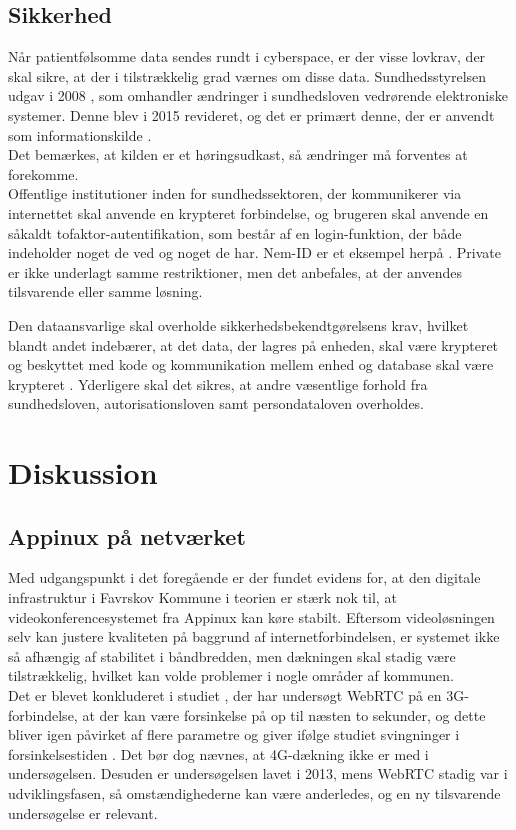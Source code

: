 \subsection{Sikkerhed}
Når patientfølsomme data sendes rundt i cyberspace, er der visse lovkrav, der skal sikre, at der i tilstrækkelig grad værnes om disse data.
Sundhedsstyrelsen udgav i 2008 , som omhandler ændringer i sundhedsloven vedrørende elektroniske systemer. Denne blev i 2015 revideret, og det er primært denne, der er anvendt som informationskilde \cite{vogi}.\\
Det bemærkes, at kilden er et høringsudkast, så ændringer må forventes at forekomme.\\
Offentlige institutioner inden for sundhedssektoren, der kommunikerer via internettet skal anvende en krypteret forbindelse, og brugeren skal anvende en såkaldt tofaktor-autentifikation, som består af en login-funktion, der både indeholder noget de ved og noget de har. Nem-ID er et eksempel herpå \cite{vogi}. Private er ikke underlagt samme restriktioner, men det anbefales, at der anvendes tilsvarende eller samme løsning.

Den dataansvarlige skal overholde sikkerhedsbekendtgørelsens krav, hvilket blandt andet indebærer, at det data, der lagres på enheden, skal være krypteret og beskyttet med kode og kommunikation mellem enhed og database skal være krypteret \cite{shbekendt}. Yderligere skal det sikres, at andre væsentlige forhold fra sundhedsloven, autorisationsloven samt persondataloven overholdes. 

\section{Diskussion}
\subsection{Appinux på netværket}
Med udgangspunkt i det foregående er der fundet evidens for, at den digitale infrastruktur i Favrskov Kommune i teorien er stærk nok til, at videokonferencesystemet fra Appinux kan køre stabilt. Eftersom videoløsningen selv kan justere kvaliteten på baggrund af internetforbindelsen, er systemet ikke så afhængig af stabilitet i båndbredden, men dækningen skal stadig være tilstrækkelig, hvilket kan volde problemer i nogle områder af kommunen.\\
Det er blevet konkluderet i studiet , der har undersøgt WebRTC på en 3G-forbindelse, at der kan være forsinkelse på op til næsten to sekunder, og dette bliver igen påvirket af flere parametre og giver ifølge studiet svingninger i forsinkelsestiden \cite{webrtcjournal}. Det bør dog nævnes, at 4G-dækning ikke er med i undersøgelsen. Desuden er undersøgelsen lavet i 2013, mens WebRTC stadig var i udviklingsfasen, så omstændighederne kan være anderledes, og en ny tilsvarende undersøgelse er relevant.

